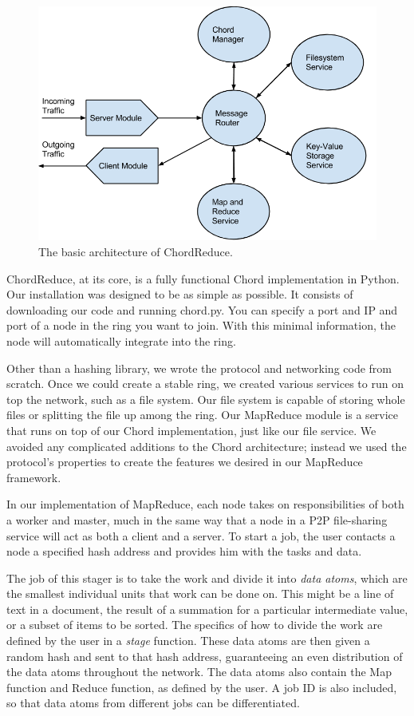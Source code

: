 \documentclass[10pt, conference, compsocconf]{IEEEtran}
\begin{document}
\begin{figure}
    \includegraphics[width=\linewidth]{crArch}
    \caption{The basic architecture of ChordReduce.}
    \label{crArch}
\end{figure}


ChordReduce, at its core, is a fully functional Chord implementation in Python.  Our installation was designed to be as simple as possible.  It consists of downloading our code \cite{code} and running chord.py.  You can specify a port and IP and port of a node in the ring you want to join.  With this minimal information, the node will automatically integrate into the ring.

Other than a hashing library, we wrote the protocol and networking code from scratch.  Once we could create a stable ring, we created various services to run on top the network, such as a file system.  Our file system is capable of storing whole files or splitting the file up among the ring. Our MapReduce module is a service that runs on top of our Chord implementation, just like our file service.    We avoided any complicated additions to the Chord architecture; instead we used the protocol's properties to create the features we desired in our MapReduce framework. 
  
In our implementation of MapReduce, each node takes on responsibilities of both a worker and master, much in the same way that a node in a P2P file-sharing service will act as both a client and a server.  To start a job, the user contacts a node a specified hash address and provides him with the tasks and data. 

The job of this stager is to take the work and divide it into \emph{data atoms}, which are the smallest individual units that work can be done on.  This might be a line of text in a document, the result of a summation for a particular intermediate value, or a subset of items to be sorted.  The specifics of how to divide the work are defined by the user in a \emph{stage} function.  These data atoms are then given a random hash and sent to that hash address, guaranteeing an even distribution of the data atoms throughout the network.  The data atoms also contain the Map function and Reduce function, as defined by the user.  A job ID is also included, so that data atoms from different jobs can be differentiated.
\end{document}
